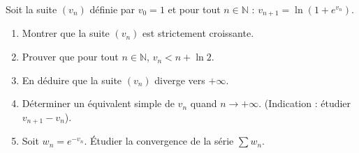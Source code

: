 \documentclass[11pt]{article}
\begin{document}
\begin{exercice}
Soit la suite $(v_n)$ définie par $v_0 = 1$ et pour tout $n \in \mathbb{N}$ : $v_{n+1} = \ln(1 + e^{v_n})$.

\begin{enumerate}
    \item Montrer que la suite $(v_n)$ est strictement croissante.
    \item Prouver que pour tout $n \in \mathbb{N}$, $v_n < n + \ln 2$.
    \item En déduire que la suite $(v_n)$ diverge vers $+\infty$.
    \item Déterminer un équivalent simple de $v_n$ quand $n \to +\infty$. (Indication : étudier $v_{n+1} - v_n$).
    \item Soit $w_n = e^{-v_n}$. Étudier la convergence de la série $\sum w_n$.
\end{enumerate}
\end{exercice}
\end{document}
